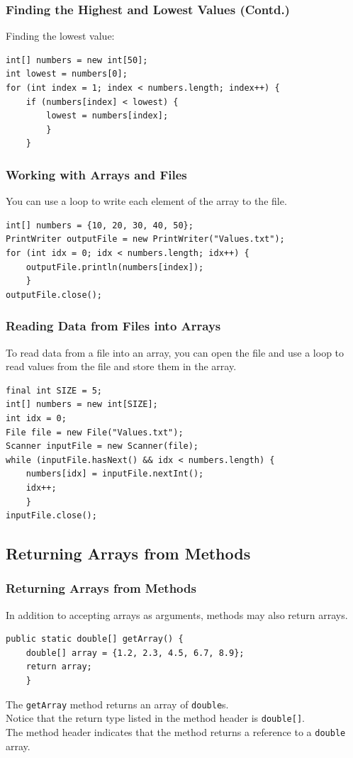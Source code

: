 \documentclass[11pt]{beamer}
\begin{document}
\begin{frame}[fragile]
    \frametitle{Finding the Highest and Lowest Values (Contd.)}
    Finding the lowest value:
    \begin{lstlisting}
int[] numbers = new int[50];
int lowest = numbers[0];
for (int index = 1; index < numbers.length; index++) {
    if (numbers[index] < lowest) {
        lowest = numbers[index];
        }
    }
    \end{lstlisting}
\end{frame}

\begin{frame}[fragile]
    \frametitle{Working with Arrays and Files}
    You can use a loop to write each element of the array to the file.
    \begin{lstlisting}
int[] numbers = {10, 20, 30, 40, 50};
PrintWriter outputFile = new PrintWriter("Values.txt");
for (int idx = 0; idx < numbers.length; idx++) {
    outputFile.println(numbers[index]);
    }
outputFile.close();
    \end{lstlisting}
\end{frame}

\begin{frame}[fragile]
    \frametitle{Reading Data from Files into Arrays}
    To read data from a file into an array, you can open the file and use a loop to read values from the file and store them in the array.
    \begin{lstlisting}
final int SIZE = 5;
int[] numbers = new int[SIZE];
int idx = 0;
File file = new File("Values.txt");
Scanner inputFile = new Scanner(file);
while (inputFile.hasNext() && idx < numbers.length) {
    numbers[idx] = inputFile.nextInt();
    idx++;
    }
inputFile.close();
    \end{lstlisting}
\end{frame}

\subsection{Returning Arrays from Methods}
\begin{frame}[fragile]
    \frametitle{Returning Arrays from Methods}
    In addition to accepting arrays as arguments, methods may also return arrays.
    \begin{lstlisting}
public static double[] getArray() {
    double[] array = {1.2, 2.3, 4.5, 6.7, 8.9};
    return array;
    }
    \end{lstlisting}
    The \texttt{getArray} method returns an array of \texttt{double}s. \\ \vspace{1em}
    Notice that the return type listed in the method header is \texttt{double[]}. \\ \vspace{1em} 
    The method header indicates that the method returns a reference to a \texttt{double} array.
\end{frame}
\end{document}
